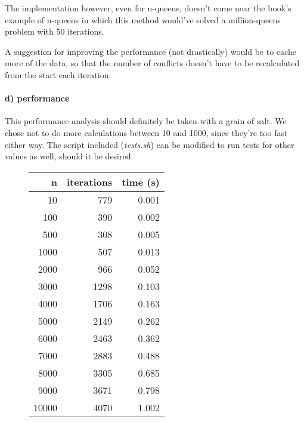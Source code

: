 \documentclass[a4paper] {article}
\begin{document}
		The implementation however, even for n-queens, doesn't come near the book's example of n-queens in which this method would've solved a million-queens problem with 50 iterations.

		A suggestion for improving the performance (not drastically) would be to cache more of the data, so that the number of conflicts doesn't have to be recalculated from the start each iteration.

	\paragraph{d) performance}
		This performance analysis should definitely be taken with a grain of salt. We chose not to do more calculations between 10 and 1000, since they're too fast either way. The script included (\emph{tests.sh}) can be modified to run tests for other values as well, should it be desired.

	\begin{figure}[h!]
		\begin{center}
		\begin{tabular}{|r|r|r|}
			\hline
			n & iterations & time (s) \\
			\hline
			10 & 779 & 0.001 \\
			100 & 390 & 0.002 \\
			500 & 308 & 0.005 \\
			1000 & 507 & 0.013 \\
			2000 & 966 & 0.052 \\
			3000 & 1298 & 0.103 \\
			4000 & 1706 & 0.163 \\
			5000 & 2149 & 0.262 \\
			6000 & 2463 & 0.362 \\
			7000 & 2883 & 0.488 \\
			8000 & 3305 & 0.685 \\
			9000 & 3671 & 0.798 \\
			10000 & 4070 & 1.002 \\
			\hline
		\end{tabular}
		\end{center}
	\end{figure}
\end{document}
